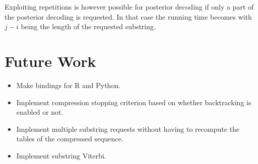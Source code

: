 Exploiting repetitions is however possible for posterior decoding if only a
part of the posterior decoding is requested. In that case the running time
becomes  with $j - i$ being the length of the
requested substring.

\section{Future Work}

\begin{itemize}
\item Make bindings for R and Python.
\item Implement compression stopping criterion based on whether backtracking is
  enabled or not.
\item Implement multiple substring requests without having to recompute the
  tables of the compressed sequence.
\item Implement substring Viterbi.
\end{itemize}


